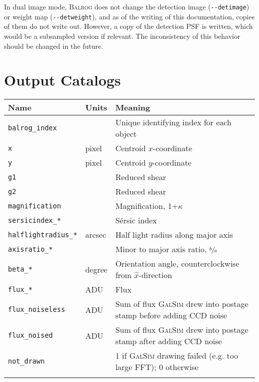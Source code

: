 \documentclass[11pt]{book}
\newcommand{\codett}[1]{\lstinline{#1}}
\newcommand{\galsim}{\textsc{GalSim}}
\newcommand{\balrog}{\textsc{Balrog}}
\newcommand{\opt}[1]{\codett{--#1}}
\newcommand{\sersic}{S\'{e}rsic}
\begin{document}
In dual image mode, \balrog{} does not change the detection image (\opt{detimage}) or weight map (\opt{detweight}), and 
as of the writing of this documentation, copies of them do not write out.
However, a copy of the detection PSF is written, which would be a subsampled version if relevant.
The inconsistency of this behavior should be changed in the future. 


\section{Output Catalogs}
\label{sec:catalogs}

\begin{table}
\caption{\balrog{}'s output truth catalog.}
\label{tab:truth}
\begin{longtabu} to \textwidth {l l X}
\toprule %
Name & Units & Meaning \\ \midrule
\texttt{balrog\_index} &  & Unique identifying index for each object\\
\texttt{x} & pixel & Centroid $x$-coordinate\\
\texttt{y} & pixel & Centroid $y$-coordinate\\
\texttt{g1} & & Reduced shear\\
\texttt{g2} & & Reduced shear\\
\texttt{magnification} & & Magnification, 1+$\kappa$ \\
\texttt{sersicindex\_*} & & \sersic{} index \\
\texttt{halflightradius\_*} & arcsec & Half light radius along major axis\\
\texttt{axisratio\_*} & & Minor to major axis ratio, $\sfrac{b}{a}$ \\
\texttt{beta\_*} & degree & Orientation angle, counterclockwise from $\hat{x}$-direction\\
\texttt{flux\_*} & ADU & Flux\\
\texttt{flux\_noiseless} & ADU & Sum of flux \galsim{} drew into postage stamp before adding CCD noise\\
\texttt{flux\_noised} & ADU & Sum of flux \galsim{} drew into postage stamp after adding CCD noise\\
\texttt{not\_drawn} & & 1 if \galsim{} drawing failed (e.g. too large FFT); 0 otherwise \\
 & & \\

\end{longtabu}
\end{table}
\end{document}
